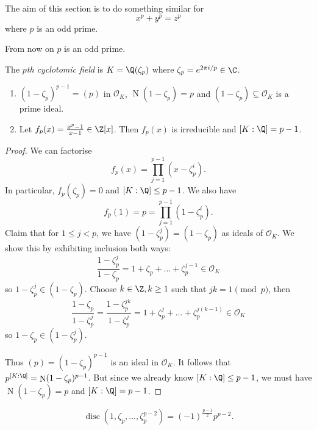 \documentclass[a4paper]{article}
\renewcommand*{\O}{\mathcal{O}}
\DeclareMathOperator{\n}{N}
\DeclareMathOperator{\disc}{disc}
\begin{document}
The aim of this section is to do something similar for
\[
  x^p + y^p = z^p
\]
where \(p\) is an odd prime.


From now on \(p\) is an odd prime.

\begin{definition}
  The \emph{\(p\)th cyclotomic field} is \(K = \Q(\zeta_p)\) where \(\zeta_p = e^{2\pi i/p} \in \C\).
\end{definition}

\begin{lemma}\leavevmode
  \begin{enumerate}
  \item \((1 - \zeta_p)^{p - 1} = (p)\) in \(\O_K\), \(\n(1 - \zeta_p) = p\) and \((1 - \zeta_p) \subseteq \O_K\) is a prime ideal.
  \item Let \(f_p(x) = \frac{x^p - 1}{x - 1} \in \Z[x]\). Then \(f_p(x)\) is irreducible and \([K:\Q] = p - 1\).
  \end{enumerate}
\end{lemma}

\begin{proof}
  We can factorise
  \[
    f_p(x) = \prod_{j = 1}^{p - 1} (x - \zeta_p^i).
  \]
  In particular, \(f_p(\zeta_p) = 0\) and \([K: \Q] \leq p - 1\). We also have
  \[
    f_p(1) = p = \prod_{j = 1}^{p - 1} (1 - \zeta_p^i).
  \]
  Claim that for \(1 \leq j < p\),  we have \((1 - \zeta_p^j) = (1 - \zeta_p)\) as ideals of \(\O_K\). We show this by exhibiting inclusion both ways:
  \[
    \frac{1 - \zeta_p^j}{1 - \zeta_p} = 1 + \zeta_p + \dots + \zeta_p^{j - 1} \in \O_K
  \]
  so \(1 - \zeta_p^j \in (1 - \zeta_p)\). Choose \(k \in \Z, k \geq 1\) such that \(jk = 1 \pmod p\), then
  \[
    \frac{1 - \zeta_p}{1 - \zeta_p^j} = \frac{1 - \zeta_p^{jk}}{1 - \zeta_p^j} = 1 + \zeta_p^j + \dots + \zeta_p^{j(k - 1)} \in \O_K
  \]
  so \(1 - \zeta_p \in (1 - \zeta_p^j)\).

  Thus \((p) = (1 - \zeta_p)^{p - 1}\) is an ideal in \(\O_K\). It follows that \(p^{[K: \Q]} = \n(1 - \zeta_p)^{p - 1}\). But since we already know \([K: \Q] \leq p - 1\), we must have \(\n(1 - \zeta_p) = p\) and \([K: \Q] = p - 1\).
\end{proof}

\begin{lemma}
  \[
    \disc(1, \zeta_p, \dots, \zeta_p^{p - 2}) = (-1)^{\frac{p - 1}{2}} p^{p - 2}.
  \]
\end{lemma}
\end{document}
